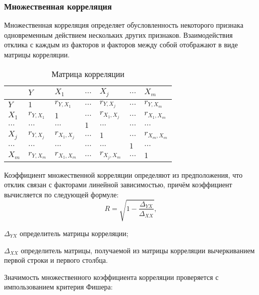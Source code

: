 \subsubsection{Множественная корреляция}
Множественная корреляция определяет обусловленность некоторого признака одновременным действием нескольких других признаков. Взаимодействия отклика с каждым из факторов и факторов между собой отображают в виде матрицы корреляции. \cite{corelMethod}

\begin{table}[H]
\begin{center}
\caption{\label{table: corelMatrix} Матрица корреляции}
\begin{tabular}{l||llllll}
      & $Y$         & $X_1$         & $...$ & $X_j$          & $...$ & $X_m$             \\ \hline\hline
$Y$   & $1$         & $r_{Y,X_1}$   & $...$ & $r_{Y,X_j}$    & $...$ & $r_{Y,X_m}$    \\
$X_1$ & $r_{Y,X_1}$ & $1 $          & $...$ & $r_{X_1,X_j}$  & $...$ & $r_{X_1,X_m}$ \\
$...$ & $...$       & $...$         & $1$   & $...$          & $...$ & $...$              \\
$X_j$ & $r_{Y,X_j}$ & $r_{X_1,X_j}$ & $...$ & $1$            & $...$ & $r_{X_m,X_m}$ \\
$...$ & $...$       & $...$         & $...$ & $...$          & $1$   & $...$              \\
$X_m$ & $r_{Y,X_m}$ & $r_{X_1,X_m}$ & $...$ & $r_{X_j,X_m}$  & $...$ & $1$               
\end{tabular}
\end{center}
\end{table}

Коэффициент множественной корреляции определяют из предположения, что отклик связан с факторами линейной зависимостью, причём коэффициент вычисляется по следующей формуле:
\begin{equation}
\label{eq:fuckMark}
R = \sqrt{1 - \frac{\Delta_{YX}}{\Delta_{XX}}},
\end{equation}
\begin{eqexpl}[15mm]
\item{$\Delta_{YX}$} определитель матрицы корреляции;
\item{$\Delta_{XX}$} определитель матрицы, получаемой из матрицы корреляции вычеркиванием первой строки и первого столбца.
\end{eqexpl}

Значимость множественного коэффициента корреляции проверяется с импользованием критерия Фишера:

